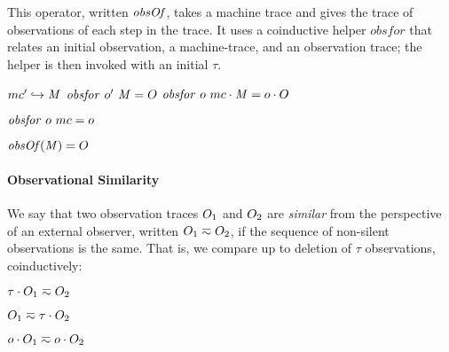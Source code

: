 \documentclass[10pt,conference]{ieeetran}%
\theoremstyle{definition}
\begin{document}
{This operator, written \(\mathit{obsOf}\), takes a machine trace and
gives the trace of observations of each step in
the trace. It uses a coinductive helper \(\mathit{obsfor}\) that relates an
initial observation, a machine-trace, and an observation trace; the helper is
then invoked with an initial \(\tau\).

                {\(mc' \hookrightarrow \mathit{M}\)}
                {\(\mathit{obsfor} ~ o' ~ \mathit{M} = O\)}
                {\(\mathit{obsfor} ~ o ~ mc \cdot \mathit{M} = o \cdot O\)}

\begin{minipage}[b]{.4\columnwidth}
  \judgment{}
           {\(\mathit{obsfor} ~ o ~ mc = o\)}
\end{minipage}
\begin{minipage}[b]{.4\columnwidth}
         {\(\mathit{obsOf}(\mathit{M}) = O\)}
\end{minipage}

\paragraph*{Observational Similarity}

We say that two observation traces $O_1$ and $O_2$ are {\em similar}
from the perspective of an external observer, written \(O_1 \eqsim
O_2\), if the sequence of non-silent observations is the same. That is, we
compare up to deletion of \(\tau\) observations, coinductively:

\begin{minipage}{.4\columnwidth}
  \judgment{}{\(\obsT \eqsim \obsT\)}
\end{minipage}
\begin{minipage}{.4\columnwidth}
           {\(\tau \cdot O_1 \eqsim O_2\)}
\end{minipage}

\begin{minipage}{.4\columnwidth}
           {\(O_1 \eqsim \tau \cdot O_2\)}
\end{minipage}
\begin{minipage}{.4\columnwidth}
           {\(o \cdot O_1 \eqsim o \cdot O_2\)}
\end{minipage}

}
\end{document}
